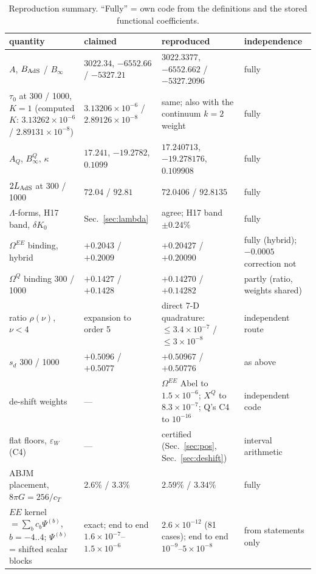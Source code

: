 \documentclass[aps,prl,onecolumn,superscriptaddress,nofootinbib]{revtex4-2}
\begin{document}
\begin{table}[!htbp]
\caption{\label{tab:repro}Reproduction summary. ``Fully'' = own code from the definitions and the
stored functional coefficients.}
\footnotesize
\begin{ruledtabular}
\begin{tabular}{L{5.2cm}L{3.8cm}L{4.4cm}L{3.4cm}}
quantity & claimed & reproduced & independence\\\hline
$A$, $B_{\rm AdS}$ / $B_\infty$ & $3022.34$, $-6552.66$ / $-5327.21$ & $3022.3377$, $-6552.662$ / $-5327.2096$ & fully\\
$\tau_0$ at 300 / 1000, $K=1$ (computed $K$: $3.13262\times10^{-6}$ / $2.89131\times10^{-8}$) & $3.13206\times10^{-6}$ / $2.89126\times10^{-8}$ & same; also with the continuum $k=2$ weight & fully\\
$A_Q$, $B_\infty^Q$, $\kappa$ & $17.241$, $-19.2782$, $0.1099$ & $17.240713$, $-19.278176$, $0.109908$ & fully\\
$2L_{\rm AdS}$ at 300 / 1000 & $72.04$ / $92.81$ & $72.0406$ / $92.8135$ & fully\\
$\Lambda$-forms, H17 band, $\delta K_0$ & Sec.~\ref{sec:lambda} & agree; H17 band $\pm0.24\%$ & fully\\
$\Omega^{EE}$ binding, hybrid & $+0.2043$ / $+0.2009$ & $+0.20427$ / $+0.20090$ & fully (hybrid); $-0.0005$ correction not\\
$\Omega^Q$ binding 300 / 1000 & $+0.1427$ / $+0.1428$ & $+0.14270$ / $+0.14282$ & partly (ratio, weights shared)\\
ratio $\rho(\nu)$, $\nu<4$ & expansion to order 5 & direct 7-D quadrature: $\le3.4\times10^{-7}$ / $\le3\times10^{-8}$ & independent route\\
$s_d$ 300 / 1000 & $+0.5096$ / $+0.5077$ & $+0.50967$ / $+0.50776$ & as above\\
de-shift weights & --- & $\Omega^{EE}$ Abel to $1.5\times10^{-6}$; $X^Q$ to $8.3\times10^{-7}$; Q's C4 to $10^{-16}$ & independent code\\
flat floors, $\varepsilon_W$ (C4) & --- & certified (Sec.~\ref{sec:pos}, Sec.~\ref{sec:deshift}) & interval arithmetic\\
ABJM placement, $8\pi G=256/c_T$ & $2.6\%$ / $3.3\%$ & $2.59\%$ / $3.34\%$ & fully\\
$EE$ kernel $=\sum_b c_b\Psi^{(b)}$, $b=-4..4$; $\Psi^{(b)}$ = shifted scalar blocks & exact; end to end $1.6\times10^{-7}$--$1.5\times10^{-6}$ & $2.6\times10^{-12}$ (81 cases); end to end $10^{-9}$--$5\times10^{-8}$ & from statements only\\

\end{tabular}
\end{ruledtabular}
\end{table}
\end{document}
